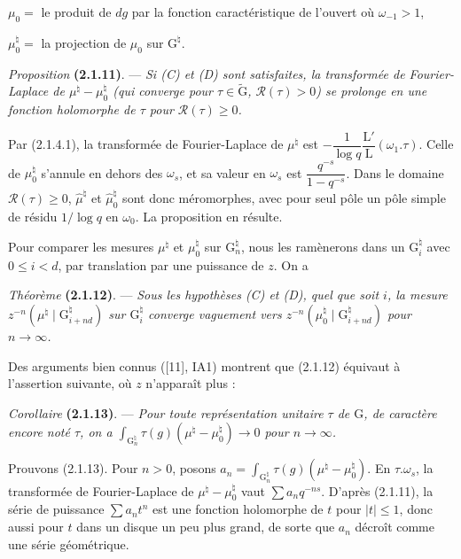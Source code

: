 \documentclass[11pt,leqno]{article}
\begin{document}
\noindent \(\mu_0=\) le produit de \(dg\) par la fonction caractéristique de l’ouvert où \(\omega_{-1}>1\),

\noindent \(\mu_0^{\natural}=\) la projection de \(\mu_0\) sur \(\mathrm{G}^{\natural}\).

\textit{Proposition} \textbf{(2.1.11)}. — \textit{Si \textup{(C)} et \textup{(D)} sont satisfaites, la transformée de Fourier-Laplace de \(\mu^{\natural}-\mu_0^{\natural}\) (qui converge pour \(\tau\in\widetilde{\mathrm{G}}\), \(\mathscr{R}(\tau)>0\)) se prolonge en une fonction holomorphe de \(\tau\) pour \(\mathscr{R}(\tau)\geq0\).}

Par (2.1.4.1), la transformée de Fourier-Laplace de \(\mu^{\natural}\) est \(-\dfrac{1}{\log q}\dfrac{\mathrm{L}'}{\mathrm{L}}(\omega_1.\tau)\). Celle de \(\mu_0^{\natural}\) s’annule en dehors des \(\omega_s\), et sa valeur en \(\omega_s\) est \(\dfrac{q^{-s}}{1-q^{-s}}\). Dans le domaine \(\mathscr{R}(\tau)\geq0\), \(\widehat{\mu}^{\natural}\) et \(\widehat{\mu}_0^{\natural}\) sont donc méromorphes, avec pour seul pôle un pôle simple de résidu \(1/\log q\) en \(\omega_0\). La proposition en résulte.

Pour comparer les mesures \(\mu^{\natural}\) et \(\mu_0^{\natural}\) sur \(\mathrm{G}_n^{\natural}\), nous les ramènerons dans un \(\mathrm{G}_i^{\natural}\) avec \(0\leq i<d\), par translation par une puissance de \(z\). On a

\textit{Théorème} \textbf{(2.1.12)}. — \textit{Sous les hypothèses \textup{(C)} et \textup{(D)}, quel que soit \(i\), la mesure \(z^{-n}(\mu^{\natural}\mid\mathrm{G}_{i+nd}^{\natural})\) sur \(\mathrm{G}_i^{\natural}\) converge vaguement vers \(z^{-n}(\mu_0^{\natural}\mid\mathrm{G}_{i+nd}^{\natural})\) pour \(n\to\infty\).}

Des arguments bien connus ([11], IA1) montrent que (2.1.12) équivaut à l’assertion suivante, où \(z\) n’apparaît plus :

\textit{Corollaire} \textbf{(2.1.13)}. — \textit{Pour toute représentation unitaire \(\tau\) de \(\mathrm{G}\), de caractère encore noté \(\tau\), on a \(\displaystyle\int_{\mathrm{G}_n^{\natural}}\tau(g)(\mu^{\natural}-\mu_0^{\natural})\to0\) pour \(n\to\infty\).}

Prouvons (2.1.13). Pour \(n>0\), posons \(a_n=\displaystyle\int_{\mathrm{G}_n^{\natural}}\tau(g)(\mu^{\natural}-\mu_0^{\natural})\). En \(\tau.\omega_s\), la transformée de Fourier-Laplace de \(\mu^{\natural}-\mu_0^{\natural}\) vaut \(\sum a_nq^{-ns}\). D’après (2.1.11), la série de puissance \(\sum a_nt^n\) est une fonction holomorphe de \(t\) pour \(|t|\leq1\), donc aussi pour \(t\) dans un disque un peu plus grand, de sorte que \(a_n\) décroît comme une série géométrique.
\end{document}
